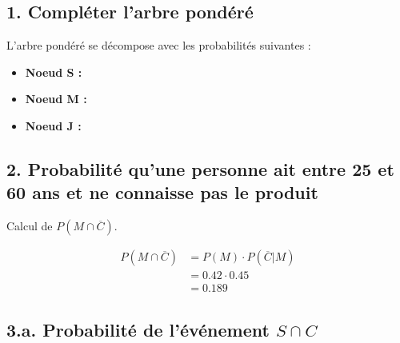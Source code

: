 \documentclass{exam}
\begin{document}
    \begin{solution}

\subsection*{1. Compléter l'arbre pondéré}

L'arbre pondéré se décompose avec les probabilités suivantes :

\begin{itemize}
  \item \textbf{Noeud S :} 
  \item \textbf{Noeud M :}
  \item \textbf{Noeud J :}
\end{itemize}

\subsection*{2. Probabilité qu'une personne ait entre 25 et 60 ans et ne connaisse pas le produit}

Calcul de \( P(M \cap \overline{C}) \).

\begin{align*}
P(M \cap \overline{C}) &= P(M) \cdot P(\overline{C}|M) \\
&= 0.42 \cdot 0.45 \\
&= 0.189
\end{align*}

\subsection*{3.a. Probabilité de l'événement \( S \cap C \)}


\end{solution}
\end{document}
